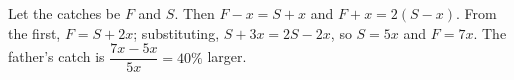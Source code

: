 Let the catches be $F$ and $S$. Then $F-x=S+x$ and $F+x=2(S-x)$. From the first, $F=S+2x$; substituting, $S+3x=2S-2x$, so $S=5x$ and $F=7x$. The father's catch is $\dfrac{7x-5x}{5x}=\boxed{40\%}$ larger.
